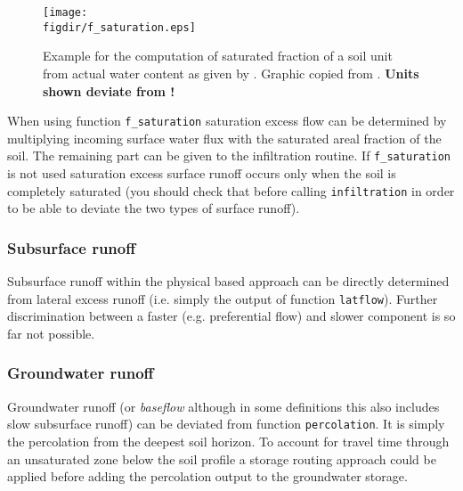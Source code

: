 \begin{figure}
  \centering
  \texttt{[image: \\figdir/f\_saturation.eps]}
  \caption[Example of saturated fraction of a soil unit.]{Example for the computation of saturated fraction of a soil unit from actual water content as given by . Graphic copied from \citet{Guentner2002}. \textbf{Units shown deviate from !} \label{fig:f_sat}}
\end{figure}

When using function \verb!f_saturation! saturation excess flow can be determined by multiplying incoming surface water flux with the saturated areal fraction of the soil. The remaining part can be given to the infiltration routine. If \verb!f_saturation! is not used saturation excess surface runoff occurs only when the soil is completely saturated (you should check that before calling \verb!infiltration! in order to be able to deviate the two types of surface runoff).


\subsubsection{Subsurface runoff}
Subsurface runoff within the physical based approach can be directly determined from lateral excess runoff (i.e. simply the output of function \verb!latflow!). Further discrimination between a faster (e.g. preferential flow) and slower component is so far not possible.


\subsubsection{Groundwater runoff}
Groundwater runoff (or \emph{baseflow} although in some definitions this also includes slow subsurface runoff) can be deviated from function \verb!percolation!. It is simply the percolation from the deepest soil horizon. To account for travel time through an unsaturated zone below the soil profile a storage routing approach could be applied before adding the percolation output to the groundwater storage.







